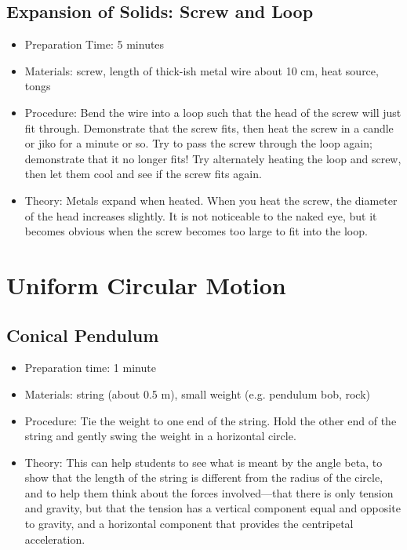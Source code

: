 \subsection{Expansion of Solids: Screw and Loop}
\begin{itemize}
\item{Preparation Time: 5 minutes}
\item{Materials: screw, length of thick-ish metal wire about 10 cm, heat source, tongs}
\item{Procedure: Bend the wire into a loop such that the head of the screw will just fit through. Demonstrate that the screw fits, then heat the screw in a candle or jiko for a minute or so. Try to pass the screw through the loop again; demonstrate that it no longer fits! Try alternately heating the loop and screw, then let them cool and see if the screw fits again.}
\item{Theory: Metals expand when heated. When you heat the screw, the diameter of the head increases slightly. It is not noticeable to the naked eye, but it becomes obvious when the screw becomes too large to fit into the loop.}
\end{itemize}

\section{Uniform Circular Motion}

\subsection{Conical Pendulum}
\begin{itemize}
\item{Preparation time: 1 minute}
\item{Materials: string (about 0.5 m), small weight (e.g. pendulum bob, rock)}
\item{Procedure: Tie the weight to one end of the string. Hold the other end of the string and gently swing the weight in a horizontal circle.}
\item{Theory: This can help students to see what is meant by the angle beta, to show that the length of the string is different from the radius of the circle, and to help them think about the forces involved—that there is only tension and gravity, but that the tension has a vertical component equal and opposite to gravity, and a horizontal component that provides the centripetal acceleration.}
\end{itemize}

